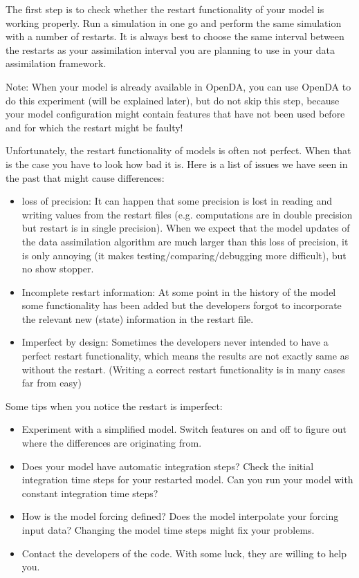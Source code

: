 The first step is to check whether the restart functionality of your model is working properly. Run a simulation in one go and perform the same simulation with a number of restarts. It is always best to choose the same interval between the restarts as your assimilation interval you are planning to use in your data assimilation framework.

Note: When your model is already available in OpenDA, you can use OpenDA to do this experiment (will be explained later), but do not skip this step, because your model configuration might contain features that have not been used before and for which the restart might be faulty!


Unfortunately, the restart functionality of models is often not perfect. When that is the case you have to look how bad it is. Here is a list of issues we have seen in the past that might cause differences:
\begin{itemize}
\item loss of precision: It can happen that some precision is lost in reading and writing values from the restart files (e.g. computations are in double precision but restart is in single precision). When we expect that the model updates of the data assimilation algorithm are much larger than this loss of precision, it is only annoying (it makes testing/comparing/debugging more difficult), but no show stopper.
\item Incomplete restart information: At some point in the history of the model some functionality has been added but the developers forgot to incorporate the relevant new (state) information in the restart file.
\item Imperfect by design: Sometimes the developers never intended to have a perfect restart functionality, which means the results are not exactly same as without the restart. (Writing a correct restart functionality is in many cases far from easy)
\end{itemize}

Some tips when you notice the restart is imperfect:
\begin{itemize}
\item Experiment with a simplified model. Switch features on and off to figure out where the differences are originating from.
\item Does your model have automatic integration steps? Check the initial integration time steps for your restarted model. Can you run your model with constant integration time steps?
\item How is the model forcing defined? Does the model interpolate your forcing input data? Changing the model time steps might fix your problems.
\item Contact the developers of the code. With some luck, they are willing to help you.
\end{itemize}

